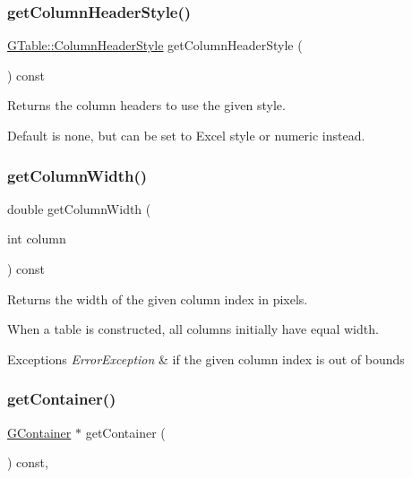 \subsubsection{\texorpdfstring{get\+Column\+Header\+Style()}{getColumnHeaderStyle()}}
{\footnotesize\ttfamily \mbox{\hyperlink{classGTable_a060cff504451bbb98530e64e936e2671}{G\+Table\+::\+Column\+Header\+Style}} get\+Column\+Header\+Style (\begin{DoxyParamCaption}{ }\end{DoxyParamCaption}) const\hspace{0.3cm}{\ttfamily [virtual]}}



Returns the column headers to use the given style. 

Default is none, but can be set to Excel style or numeric instead. \mbox{\label{classGTable_a4722043b7c3f968238968d3053b8a277}} 
\subsubsection{\texorpdfstring{get\+Column\+Width()}{getColumnWidth()}}
{\footnotesize\ttfamily double get\+Column\+Width (\begin{DoxyParamCaption}\item[{int}]{column }\end{DoxyParamCaption}) const\hspace{0.3cm}{\ttfamily [virtual]}}



Returns the width of the given column index in pixels. 

When a table is constructed, all columns initially have equal width. 
\begin{DoxyExceptions}{Exceptions}
{\em Error\+Exception} & if the given column index is out of bounds \\
\hline
\end{DoxyExceptions}
\mbox{\label{classGInteractor_a7a6e317c29d61030929b4cd2d1c00fe7}} 
\subsubsection{\texorpdfstring{get\+Container()}{getContainer()}}
{\footnotesize\ttfamily \mbox{\hyperlink{classGContainer}{G\+Container}} $\ast$ get\+Container (\begin{DoxyParamCaption}{ }\end{DoxyParamCaption}) const\hspace{0.3cm}{\ttfamily [virtual]}, {\ttfamily [inherited]}}



